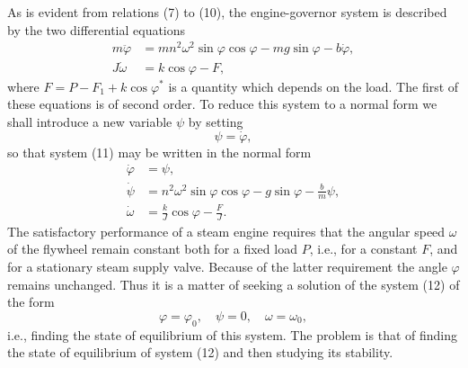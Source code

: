\documentclass[10pt,a5paper]{book}
\theoremstyle{plain}
\theoremstyle{definition}
\theoremstyle{remark}
\begin{document}
As is evident from relations (7) to (10), the engine-governor system is described by the two differential equations
\begin{align*}
m \ddot{\varphi} & =m n^{2} \omega^{2} \sin \varphi \cos \varphi-m g \sin \varphi-b \dot{\varphi}, \\
J \dot{\omega} & =k \cos \varphi-F, \tag{11}
\end{align*}
where $F=P-F_{1}+k \cos \varphi^{*}$ is a quantity which depends on the load. The first of these equations is of second order. To reduce this system to a normal form we shall introduce a new variable $\psi$ by setting
\[
\psi=\dot{\varphi},
\]
so that system (11) may be written in the normal form
\begin{align*}
\dot{\varphi} & =\psi, \\
\dot{\psi} & =n^{2} \omega^{2} \sin \varphi \cos \varphi-g \sin \varphi-\frac{b}{m} \psi,  \tag{12}\\
\dot{\omega} & =\frac{k}{J} \cos \varphi-\frac{F}{J} .
\end{align*}
The satisfactory performance of a steam engine requires that the angular speed $\omega$ of the flywheel remain constant both for a fixed load $P$, i.e., for a constant $F$, and for a stationary steam supply valve. Because of the latter requirement the angle $\varphi$ remains unchanged. Thus it is a matter of seeking a solution of the system (12) of the form
\[
\varphi=\varphi_{0}, \quad \psi=0, \quad \omega=\omega_{0},
\]
i.e., finding the state of equilibrium of this system. The problem is that of finding the state of equilibrium of system (12) and then studying its stability.
\end{document}
